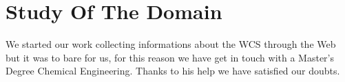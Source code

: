 \chapter{Study Of The Domain}
We started our work collecting informations about the WCS through the Web but it was to bare for us, for this reason we have get in touch with a Master’s Degree Chemical Engineering. Thanks to his help we have satisfied our doubts.
